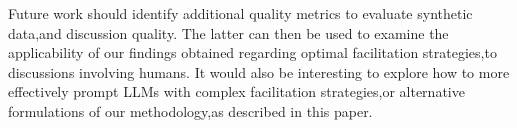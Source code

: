 %
Future work should identify additional quality metrics to evaluate synthetic data,and discussion quality. The latter can then be used to examine the applicability of our findings obtained regarding optimal facilitation strategies,to discussions involving humans. It would also be interesting to explore how to more effectively prompt LLMs with complex facilitation strategies,or alternative formulations of our methodology,as described in this paper.